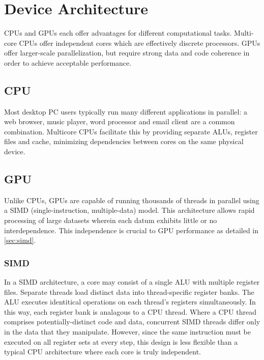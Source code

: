 \chapter{Device Architecture} \label{ch:device architecture}

CPUs and GPUs each offer advantages for different computational tasks. Multi-core CPUs offer independent cores which are effectively discrete processors. GPUs offer larger-scale parallelization, but require strong data and code coherence in order to achieve acceptable performance.

\section{CPU}

Most desktop PC users typically run many different applications in parallel: a web browser, music player, word processor and email client are a common combination. Multicore CPUs facilitate this by providing separate ALUs, register files and cache, minimizing dependencies between cores on the same physical device. 

\section{GPU}

Unlike CPUs, GPUs are capable of running thousands of threads in parallel using a SIMD (single-instruction, multiple-data) model. This architecture allows rapid processing of large datasets wherein each datum exhibits little or no interdependence.  This independence is crucial to GPU performance as detailed in \autoref{sec:simd}.

\subsection{SIMD}\label{sec:simd}

In a SIMD\cite{Massingill:2007:SAP:1772070.1772078} architecture, a core may consist of a single ALU with multiple register files. Separate threads load distinct data into thread-specific register banks. The ALU executes identitical operations on each thread's registers simultaneously. In this way, each register bank is analagous to a CPU thread. Where a CPU thread comprises potentially-distinct code and data, concurrent SIMD threads differ only in the data that they manipulate.  However, since the same instruction must be executed on all register sets at every step, this design is less flexible than a typical CPU architecture where each core is truly independent. 

